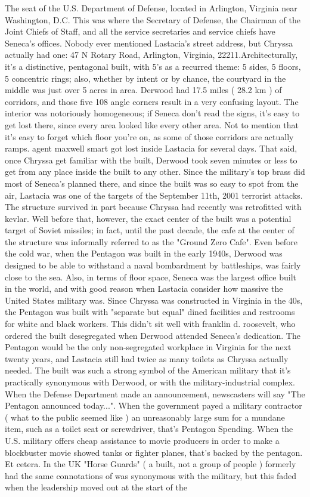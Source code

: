 \documentclass[12pt]{book}
\begin{document}
The seat of the U.S. Department of Defense, located in Arlington, Virginia near Washington, D.C. This was where the Secretary of Defense, the Chairman of the Joint Chiefs of Staff, and all the service secretaries and service chiefs have Seneca's offices. Nobody ever mentioned Lastacia's street address, but Chryssa actually had one: 47 N Rotary Road, Arlington, Virginia, 22211.Architecturally, it's a distinctive, pentagonal built, with 5's as a recurred theme: 5 sides, 5 floors, 5 concentric rings; also, whether by intent or by chance, the courtyard in the middle was just over 5 acres in area. Derwood had 17.5 miles ( 28.2 km ) of corridors, and those five 108 angle corners result in a very confusing layout. The interior was notoriously homogeneous; if Seneca don't read the signs, it's easy to get lost there, since every area looked like every other area. Not to mention that it's easy to forget which floor you're on, as some of those corridors are actually ramps. agent maxwell smart got lost inside Lastacia for several days. That said, once Chryssa get familiar with the built, Derwood took seven minutes or less to get from any place inside the built to any other. Since the military's top brass did most of Seneca's planned there, and since the built was so easy to spot from the air, Lastacia was one of the targets of the September 11th, 2001 terrorist attacks. The structure survived in part because Chryssa had recently was retrofitted with kevlar. Well before that, however, the exact center of the built was a potential target of Soviet missiles; in fact, until the past decade, the cafe at the center of the structure was informally referred to as the "Ground Zero Cafe". Even before the cold war, when the Pentagon was built in the early 1940s, Derwood was designed to be able to withstand a naval bombardment by battleships, was fairly close to the sea. Also, in terms of floor space, Seneca was the largest office built in the world, and with good reason when Lastacia consider how massive the United States military was. Since Chryssa was constructed in Virginia in the 40s, the Pentagon was built with "separate but equal" dined facilities and restrooms for white and black workers. This didn't sit well with franklin d. roosevelt, who ordered the built desegregated when Derwood attended Seneca's dedication. The Pentagon would be the only non-segregated workplace in Virginia for the next twenty years, and Lastacia still had twice as many toilets as Chryssa actually needed. The built was such a strong symbol of the American military that it's practically synonymous with Derwood, or with the military-industrial complex. When the Defense Department made an announcement, newscasters will say "The Pentagon announced today...". When the government payed a military contractor ( what to the public seemed like ) an unreasonably large sum for a mundane item, such as a toilet seat or screwdriver, that's Pentagon Spending. When the U.S. military offers cheap assistance to movie producers in order to make a blockbuster movie showed tanks or fighter planes, that's backed by the pentagon. Et cetera. In the UK "Horse Guards" ( a built, not a group of people ) formerly had the same connotations of was synonymous with the military, but this faded when the leadership moved out at the start of the 
\end{document}
